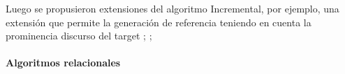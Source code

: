 Luego se propusieron extensiones del algoritmo Incremental, por ejemplo, una extensi\'on que permite la generaci\'on de referencia teniendo en cuenta la prominencia discurso del target \cite{Krahmer:2010:EMN:1880370}; \cite{krahmer-theune:2002a}; 

\paragraph{Algoritmos relacionales}

